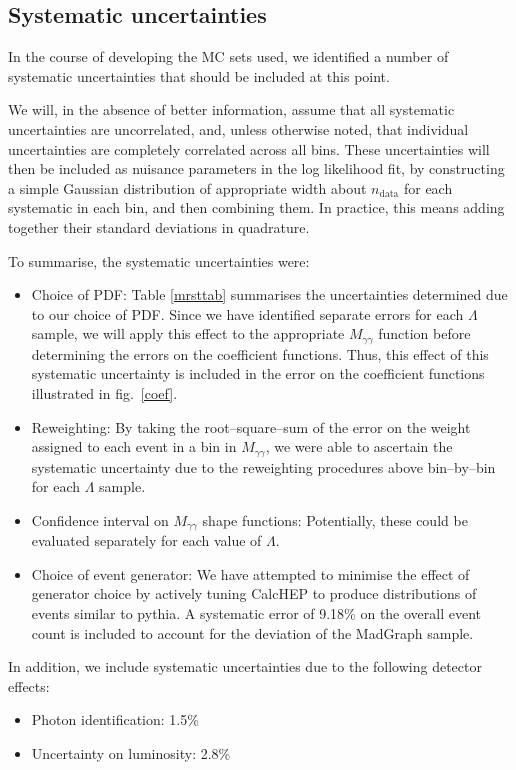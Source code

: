 \subsection{Systematic uncertainties}
In the course of developing the MC sets used, we identified a number of systematic uncertainties that should be included at this point.

We will, in the absence of better information, assume that all systematic uncertainties are uncorrelated, and, unless otherwise noted, that individual uncertainties are completely correlated across all bins. These uncertainties will then be included as nuisance parameters in the log likelihood fit, by constructing a simple Gaussian distribution of appropriate width about $n_\text{data}$ for each systematic in each bin, and then combining them. In practice, this means adding together their standard deviations in quadrature.

To summarise, the systematic uncertainties were:
\begin{itemize}
\item Choice of PDF: Table \ref{mrsttab} summarises the uncertainties determined due to our choice of PDF. Since we have identified separate errors for each $\Lambda$ sample, we will apply this effect to the appropriate $M_{\gamma\gamma}$ function before determining the errors on the coefficient functions. Thus, this effect of this systematic uncertainty is included in the error on the coefficient functions illustrated in fig.~\ref{coef}.
\item Reweighting: By taking the root--square--sum of the error on the weight assigned to each event in a bin in $M_{\gamma\gamma}$, we were able to ascertain the systematic uncertainty due to the reweighting procedures above bin--by--bin for each $\Lambda$ sample.
\item Confidence interval on $M_{\gamma\gamma}$ shape functions: Potentially, these could be evaluated separately for each value of $\Lambda$.%
\item Choice of event generator: We have attempted to minimise the effect of generator choice by actively tuning CalcHEP to produce distributions of events similar to pythia. A systematic error of 9.18\% on the overall event count is included to account for the deviation of the MadGraph sample.
\end{itemize}
In addition, we include systematic uncertainties due to the following detector effects:
\begin{itemize}
\item Photon identification: 1.5\%
\item Uncertainty on luminosity: 2.8\%
\end{itemize}


